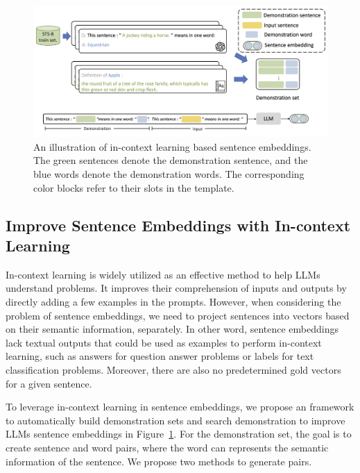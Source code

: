 \documentclass{article}
\begin{document}
\begin{figure}
\centering
\vspace{-13pt}
	\includegraphics[width=\columnwidth]{framework.png}
\caption{
  An illustration of in-context learning based sentence embeddings.
  The \textcolor{greensentence}{green} sentences denote the demonstration sentence, and the \textcolor{blueword}{blue} words denote the demonstration words. The corresponding color blocks refer to their slots in the template.
} \label{fig:framework}
\vspace{-10pt}
\end{figure}

\subsection{Improve Sentence Embeddings with In-context Learning}\label{sec:method_icl}
In-context learning is widely utilized as an effective method to help LLMs understand problems. It improves their comprehension of inputs and outputs by directly adding a few examples in the prompts.
However, when considering the problem of sentence embeddings, we need to project sentences into vectors based on their semantic information, separately.
In other word, sentence embeddings lack textual outputs that could be used as examples to perform in-context learning, such as answers for question answer problems or labels for text classification problems. Moreover, there are also no predetermined gold vectors for a given sentence.

To leverage in-context learning in sentence embeddings, we propose an framework to automatically build demonstration sets and search demonstration to improve LLMs sentence embeddings in Figure~\ref{fig:framework}.
For the demonstration set, the goal is to create sentence and word pairs, where the word can represents the semantic information of the sentence.
We propose two methods to generate pairs.
\end{document}
